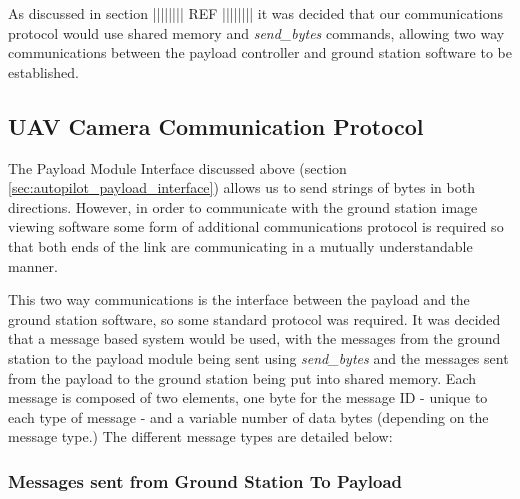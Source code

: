 As discussed in section |||||||| REF |||||||| it was decided that 
our communications protocol would use shared memory and \emph{send\_bytes} 
commands, allowing two way communications between the payload controller and 
ground station software to be established.

\subsection{UAV Camera Communication Protocol}
The Payload Module Interface discussed above (section \ref{sec:autopilot_payload_interface})
allows us to send strings of bytes in both directions. However, in order to 
communicate with the ground station image viewing software some form of 
additional communications protocol is required so that both ends of the link 
are communicating in a mutually understandable manner.

This two way communications is the interface between the payload and the 
ground station software, so some standard protocol was required. It was decided
that a message based system would be used, with the messages from the ground
station to the payload module being sent using \emph{send\_bytes} and the 
messages sent from the payload to the ground station being put into shared
memory. Each message is composed of two elements, one byte for the message ID 
- unique to each type of message - and a variable number of data bytes 
(depending on the message type.) The different message types are detailed 
below:

\subsubsection*{Messages sent from Ground Station To Payload}

